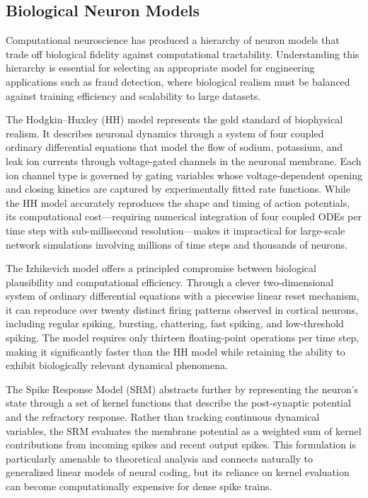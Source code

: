 \subsection{Biological Neuron Models}

Computational neuroscience has produced a hierarchy of neuron models that trade off biological fidelity against computational tractability. Understanding this hierarchy is essential for selecting an appropriate model for engineering applications such as fraud detection, where biological realism must be balanced against training efficiency and scalability to large datasets.

The Hodgkin--Huxley (HH) model represents the gold standard of biophysical realism. It describes neuronal dynamics through a system of four coupled ordinary differential equations that model the flow of sodium, potassium, and leak ion currents through voltage-gated channels in the neuronal membrane. Each ion channel type is governed by gating variables whose voltage-dependent opening and closing kinetics are captured by experimentally fitted rate functions. While the HH model accurately reproduces the shape and timing of action potentials, its computational cost---requiring numerical integration of four coupled ODEs per time step with sub-millisecond resolution---makes it impractical for large-scale network simulations involving millions of time steps and thousands of neurons.

The Izhikevich model offers a principled compromise between biological plausibility and computational efficiency. Through a clever two-dimensional system of ordinary differential equations with a piecewise linear reset mechanism, it can reproduce over twenty distinct firing patterns observed in cortical neurons, including regular spiking, bursting, chattering, fast spiking, and low-threshold spiking. The model requires only thirteen floating-point operations per time step, making it significantly faster than the HH model while retaining the ability to exhibit biologically relevant dynamical phenomena.

The Spike Response Model (SRM) abstracts further by representing the neuron's state through a set of kernel functions that describe the post-synaptic potential and the refractory response. Rather than tracking continuous dynamical variables, the SRM evaluates the membrane potential as a weighted sum of kernel contributions from incoming spikes and recent output spikes. This formulation is particularly amenable to theoretical analysis and connects naturally to generalized linear models of neural coding, but its reliance on kernel evaluation can become computationally expensive for dense spike trains.

